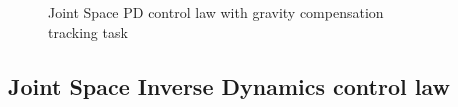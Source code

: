 \documentclass{article}
\begin{document}
\begin{figure}[H]
    \captionsetup{justification=centering}
    \noindent

    \caption{Joint Space PD control law with gravity compensation \\ tracking task}
    \label{fig:js_PD_gravity_compensation_tracking}
\end{figure}

\subsection{Joint Space Inverse Dynamics control law}
\end{document}
